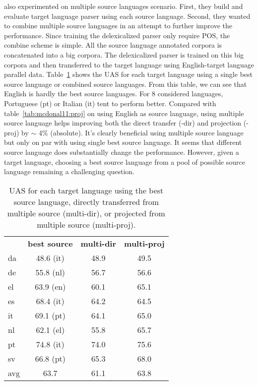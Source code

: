 \cite{McDonald:2011:MTD} also experimented on multiple source languages scenario. First, they build and evaluate target language parser using each source language. Second, they wanted to combine multiple source languages in an attempt to further improve the performance. Since training the delexicalized parser only require POS, the combine scheme is simple. All the source language annotated corpora is concatenated into a big corpora. The delexicalized parser is trained on this big corpora and then transferred to the target language using English-target language parallel data. Table~\ref{tab:mcdonal11:mutisource} shows the UAS for each target language using a single best source language or combined source languages. From this table, we can see that English is hardly the best source languages. For 8 considered languages, Portuguese (pt) or Italian (it) tent to perform better. Compared with table~\ref{tab:mcdonal11:proj} on using English as source language, using multiple source language helps improving both the direct transfer (-dir) and projection (-proj) by $\sim$ 4\% (absolute). It's clearly beneficial using multiple source language but only on par with using single best source language. 
It seems that different source language does substantially change the performance. However, given a target language, choosing a best source language from a pool of possible source language remaining a challenging question. 
\begin{table}
\centering
\begin{tabular}{lccc}
    & \textbf{best source} & \textbf{multi-dir} & \textbf{multi-proj} \\
da  & 48.6 (it)   & 48.9      & 49.5       \\
de  & 55.8 (nl)   & 56.7      & 56.6       \\
el  & 63.9 (en)   & 60.1      & 65.1       \\
es  & 68.4 (it)   & 64.2      & 64.5       \\
it  & 69.1 (pt)   & 64.1      & 65.0       \\
nl  & 62.1 (el)   & 55.8      & 65.7       \\
pt  & 74.8 (it)   & 74.0      & 75.6       \\
sv  & 66.8 (pt)   & 65.3      & 68.0       \\
\hline
avg & 63.7        & 61.1      & 63.8      
\end{tabular}
\caption{UAS for each target language using the best source language, directly transferred from multiple source (multi-dir), or projected from multiple source (multi-proj).}
\label{tab:mcdonal11:mutisource}
\end{table}

